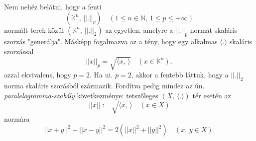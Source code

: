 \documentclass[12pt]{article}
\newcommand{\N}{\mathbb{N}}
\newcommand{\K}{\mathbb{K}}
\begin{document}
    Nem nehéz belátni, hogy a fenti
    \[
        (\K^n, \, ||.||_p) \quad (1 \leq n \in \N, \, 1 \leq p \leq + \infty)
    \]
    normált terek közül $(\K^n, \, ||.||_2)$ az egyetlen, amelyre a $||.||_p$ normát skaláris szorzás "generálja". Másképp fogalmazva az a tény, hogy egy alkalmas $\langle . \rangle$ skaláris szorzással
    \[
        ||x||_p = \sqrt{\langle x, \, \rangle} \quad (x \in \K^n),
    \]
    azzal ekvivalens, hogy $p=2$. Ha ui. $p=2$, akkor a fentebb láttuk, hogy a $||.||_2$ norma skaláris szorásból származik. Fordítva pedig mindez az ún. \textit{paralelogramma-szabály} következménye: tetszőleges $(X, \, \langle . \rangle)$ tér esetén az
    \[
        ||x|| := \sqrt{\langle x, \, \rangle} \quad (x \in X)
    \]
    normára
    \[
        ||x+y||^2 + ||x-y||^2 = 2(||x||^2 + ||y||^2) \quad (x, \, y \in X).
    \]
\end{document}
